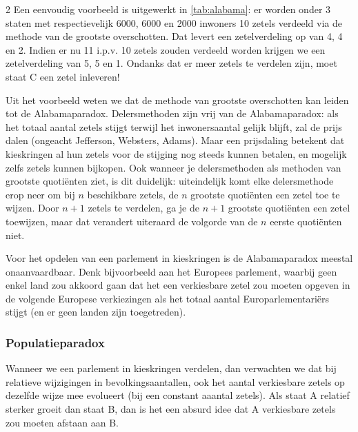 \begin{multicols}{2}
Een eenvoudig voorbeeld is uitgewerkt in \autoref{tab:alabama}: er worden onder 3 staten met respectievelijk 6000, 6000 en 2000 inwoners 10 zetels verdeeld via de methode van de grootste overschotten. Dat levert een zetelverdeling op van 4, 4 en 2. Indien er nu 11 i.p.v. 10 zetels zouden verdeeld worden krijgen we een zetelverdeling van 5, 5 en 1. Ondanks dat er meer zetels te verdelen zijn, moet staat C een zetel inleveren!

Uit het voorbeeld weten we dat de methode van grootste overschotten kan leiden tot de Alabamaparadox. Delersmethoden zijn vrij van de Alabamaparadox: als het totaal aantal zetels stijgt terwijl het inwonersaantal gelijk blijft, zal de prijs dalen (ongeacht Jefferson, Websters, Adams). Maar een prijsdaling betekent dat kieskringen al hun zetels voor de stijging nog steeds kunnen betalen, en mogelijk zelfs zetels kunnen bijkopen. Ook wanneer je delersmethoden als methoden van grootste quotiënten ziet, is dit duidelijk: uiteindelijk komt elke delersmethode erop neer om bij $n$ beschikbare zetels, de $n$ grootste quotiënten een zetel toe te wijzen. Door $n+1$ zetels te verdelen, ga je de $n+1$ grootste quotiënten een zetel toewijzen, maar dat verandert uiteraard de volgorde van de $n$ eerste quotiënten niet.

Voor het opdelen van een parlement in kieskringen is de Alabamaparadox meestal onaanvaardbaar. Denk bijvoorbeeld aan het Europees parlement, waarbij geen enkel land zou akkoord gaan dat het een verkiesbare zetel zou moeten opgeven in de volgende Europese verkiezingen als het totaal aantal Europarlementariërs stijgt (en er geen landen zijn toegetreden). 

\subsubsection{Populatieparadox}
Wanneer we een parlement in kieskringen verdelen, dan verwachten we dat bij relatieve wijzigingen in bevolkingsaantallen, ook het aantal verkiesbare zetels op dezelfde wijze mee evolueert (bij een constant aaantal zetels). Als staat A relatief sterker groeit dan staat B, dan is het een absurd idee dat A verkiesbare zetels zou moeten afstaan aan B.  


\end{multicols}
